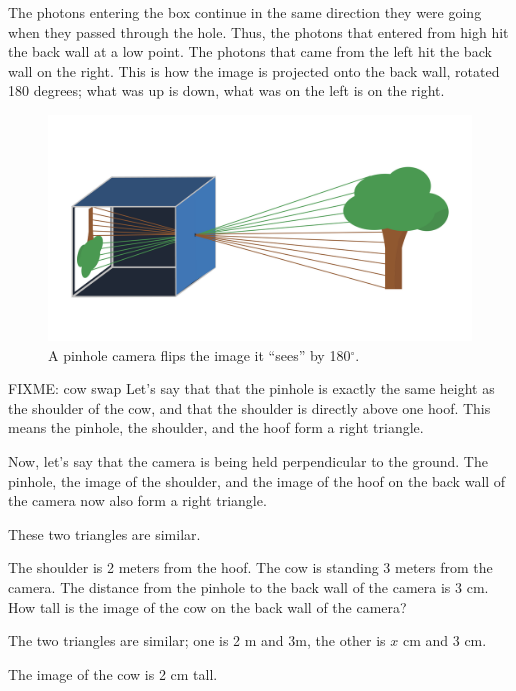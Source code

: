 The photons entering the box continue in the same direction they were
going when they passed through the hole. Thus, the photons that
entered from high hit the back wall at a low point. The photons that came from
the left hit the back wall on the right. This is how the image is projected
onto the back wall, rotated 180 degrees; what was up is down, what was
on the left is on the right.
\begin{figure}[htbp]
    \centering
    \includegraphics[width=1\textwidth]{pinholeCamera.png}
    \caption{A pinhole camera flips the image it ``sees'' by 180$^\circ$.}
    \label{fig:example}
\end{figure}


\begin{Exercise}[title={Height of the image}, label=image_height]

FIXME: cow swap
Let's say that that the pinhole is exactly the same height as the
shoulder of the cow, and that the shoulder is directly above one hoof.
This means the pinhole, the shoulder, and the hoof form a right triangle.

Now, let's say that the camera is being held perpendicular to the
ground. The pinhole, the image of the shoulder, and the image of
the hoof on the back wall of the camera now also form a right triangle.

These two triangles are similar.

The shoulder is 2 meters from the hoof. The cow is standing 3 meters
from the camera. The distance from the pinhole to the back wall of
the camera is 3 cm. How tall is the image of the cow on the back wall
of the camera?

\end{Exercise}
\begin{Answer}[ref=image_height]

The two triangles are similar; one is 2 m and 3m, the other is $x$ cm and 3 cm.

The image of the cow is 2 cm tall.

\end{Answer}

